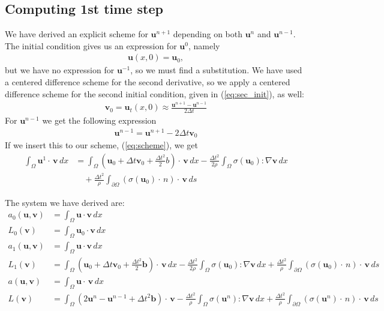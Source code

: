 \documentclass[twoside]{article}
\begin{document}
\subsection{Computing 1st time step}
We have derived an explicit scheme for \( \mathbf{u}^{n+1}\) depending on both \( \mathbf{u}^n\) and \( \mathbf{u}^{n-1}\). The initial condition gives us an expression for \( \mathbf{u}^0\), namely
\begin{align*}
	\mathbf{u}(x, 0) = \mathbf{u}_0,
\end{align*}
but we have no expression for \( \mathbf{u}^{-1}\), so we must find a substitution.
We have used a centered difference scheme for the second derivative, so we apply a centered difference scheme for the second initial condition,  given in (\ref{eq:sec_init}), as well:
\begin{align*}
	\mathbf{v}_0 = \mathbf{u}_t(x, 0) \approx \frac{\mathbf{u}^{n+1} - \mathbf{u}^{n-1}}{2\Delta t}
\end{align*}
For \( \mathbf{u}^{n-1}\) we get the following expression
\begin{align}
	\mathbf{u}^{n-1} = \mathbf{u}^{n+1} - 2 \Delta t \mathbf{v}_0
\end{align}
If we insert this to our scheme, (\ref{eq:scheme}), we get
\begin{align*}
	\int_{\Omega} \mathbf{u}^{1} \cdot \, \mathbf{v} \, dx 
		&= \int_{\Omega} \left( \mathbf{u}_{0} + \Delta t \mathbf{v}_0 + \frac{\Delta t^2}{2} b \right)  \cdot \, \mathbf{v} \, dx 
			- \frac{\Delta t^2}{2 \rho} \int_{\Omega}  \sigma(\mathbf{u}_0) : \nabla \mathbf{v} \, dx \\
			&\quad+ \frac{\Delta t^2}{\rho}  \int_{\partial \Omega} (\sigma(\mathbf{u}_0) \cdot \,n) \cdot \, \mathbf{v} \, ds
\end{align*}

The system we have derived are:
\begin{align}
	a_0(\mathbf{u}, \mathbf{v}) &= \int_{\Omega} \mathbf{u} \cdot \mathbf{v} \, dx \\
	L_0(\mathbf{v}) &= \int_{\Omega} \mathbf{u}_0 \cdot \mathbf{v}\, dx \\
	a_1(\mathbf{u}, \mathbf{v}) &= \int_{\Omega} \mathbf{u} \cdot \mathbf{v} \, dx \\
	L_1(\mathbf{v}) &=  \int_{\Omega} \left( \mathbf{u}_{0} + \Delta t \mathbf{v}_0 + \frac{\Delta t^2}{2} \mathbf{b} \right)  \cdot \, \mathbf{v} \, dx - \frac{\Delta t^2}{2 \rho} \int_{\Omega}  \sigma(\mathbf{u}_0) : \nabla \mathbf{v} \, dx + \frac{\Delta t^2}{\rho}  \int_{\partial \Omega} (\sigma(\mathbf{u}_0) \cdot \,n) \cdot \, \mathbf{v} \, ds \\
	a(\mathbf{u}, \mathbf{v}) &= \int_{\Omega} \mathbf{u} \cdot \, \mathbf{v} \, dx \\
	L(\mathbf{v}) &= \int_{\Omega} \left( 2\mathbf{u}^{n} - \mathbf{u}^{n-1} + \Delta t^2 \mathbf{b} \right)  \cdot \, \mathbf{v}  -  \frac{\Delta t^2}{\rho}  \int_{\Omega}\sigma(\mathbf{u}^n) : \nabla \mathbf{v} \,  dx + \frac{\Delta t^2}{\rho}  \int_{\partial \Omega} (\sigma(\mathbf{u}^n) \cdot \,n) \cdot \, \mathbf{v} \, ds
\end{align}
\end{document}
